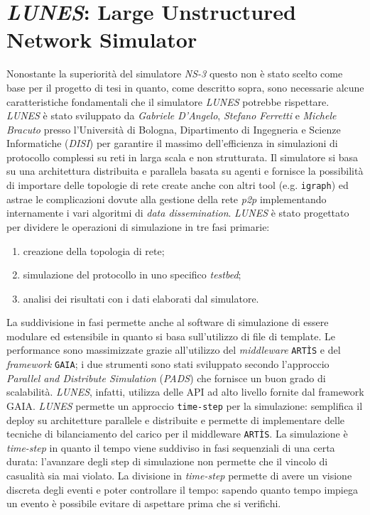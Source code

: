 \section{\textit{LUNES}: Large Unstructured Network Simulator}
Nonostante la superiorità del simulatore \textit{NS-3} questo non è stato scelto come base per il progetto di tesi in quanto, come descritto sopra, sono necessarie alcune caratteristiche fondamentali che il simulatore \textit{LUNES} potrebbe rispettare.\newline
\textit{LUNES}\cite{gdalunes} è stato sviluppato da \textit{Gabriele D'Angelo}, \textit{Stefano Ferretti} e \textit{Michele Bracuto} presso l'Università di Bologna, Dipartimento di Ingegneria e Scienze Informatiche (\textit{DISI}) per garantire il massimo dell'efficienza in simulazioni di protocollo complessi su reti in larga scala e non strutturata.\newline
Il simulatore si basa su una architettura distribuita e parallela basata su agenti e fornisce la possibilità di importare delle topologie di rete create anche con altri tool (e.g. \texttt{igraph}) ed astrae le complicazioni dovute alla gestione della rete \textit{p2p} implementando internamente i vari algoritmi di \textit{data dissemination}. \textit{LUNES} è stato progettato per dividere le operazioni di simulazione in tre fasi primarie:
\begin{enumerate}
    \item creazione della topologia di rete;
    \item simulazione del protocollo in uno specifico \textit{testbed};
    \item analisi dei risultati con i dati elaborati dal simulatore.
\end{enumerate}
La suddivisione in fasi permette anche al software di simulazione di essere modulare ed estensibile in quanto si basa sull'utilizzo di file di template. Le performance sono massimizzate grazie all'utilizzo del \textit{middleware} \texttt{ARTÌS} e del \textit{framework} \texttt{GAIA}; i due strumenti sono stati sviluppato secondo l'approccio \textit{Parallel and Distribute Simulation} (\textit{PADS}) che fornisce un buon grado di scalabilità. \textit{LUNES}, infatti, utilizza delle API ad alto livello fornite dal framework GAIA.
\textit{LUNES} permette un approccio \texttt{time-step} per la simulazione: semplifica il deploy su architetture parallele e distribuite e permette di implementare delle tecniche di bilanciamento del carico per il middleware \texttt{ARTÌS}.
La simulazione è \textit{time-step} in quanto il tempo viene suddiviso in fasi sequenziali di una certa durata: l'avanzare degli step di simulazione non permette che il vincolo di casualità sia mai violato. La divisione in \textit{time-step} permette di avere un visione discreta degli eventi e poter controllare il tempo: sapendo quanto tempo impiega un evento è possibile evitare di aspettare prima che si verifichi.
